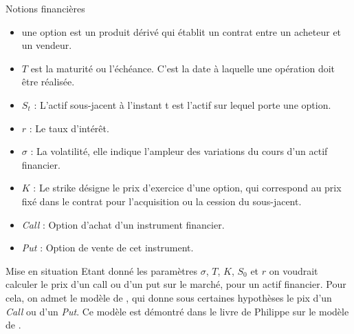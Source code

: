 \documentclass[final]{beamer}
\newlength{\onecolwid}
\begin{document}
\begin{frame}[t]
\begin{columns}[t]
\begin{column}{\onecolwid}
\vspace{2cm}
\begin{block}{Notions financières}
  \begin{itemize}
    \item une option est un produit dérivé qui établit un contrat entre un acheteur et un vendeur.
    \item $T$ est la maturité ou l'échéance. C'est la date à laquelle une opération doit être réalisée.
    \item $S_t$ : L'actif sous-jacent à l'instant t est l'actif sur lequel porte une option.
    \item $r$ : Le taux d'intérêt.
    \item $\sigma$ : La volatilité, elle indique l'ampleur des variations du cours d'un actif financier.
    \item $K$ : Le strike désigne le prix d'exercice d'une option, qui correspond au prix fixé dans le contrat pour l’acquisition ou la cession du sous-jacent.
    \item \textit{Call} : Option d'achat d'un instrument financier.
    \item \textit{Put} : Option de vente de cet instrument.
  \end{itemize}
  \vspace{2cm}
  \begin{alertblock}{Mise en situation}
    Etant donné les paramètres $\sigma$, $T$, $K$, $S_0$ et $r$ on voudrait calculer le prix d'un call ou d'un put sur le marché, pour un actif financier.
    \newline
    Pour cela, on admet le modèle de , qui donne sous certaines hypothèses le pix d'un \textit{Call} ou d'un \textit{Put}. Ce modèle est démontré dans le livre de Philippe   sur le modèle de .
    \newline
  \end{alertblock}
\end{block}




\end{column} %


\end{columns}
\end{frame}
\end{document}
